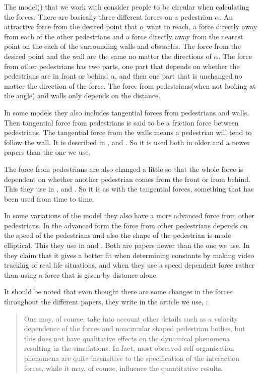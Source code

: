 The model(\cite{self-org}) that we work with consider people to be circular when calculating the forces. There are basically three different forces on a pedestrian $\alpha$. An attractive force from the desired point that $\alpha$ want to reach, a force directly away from each of the other pedestrians and a force directly away from the nearest point on the each of the surrounding  walls and obstacles. The force from the desired point and the wall are the same no matter the directions of $\alpha$. The force from other pedestrians has two parts, one part that depends on whether the pedestrians are in front or behind $\alpha$, and then one part that is unchanged no matter the direction of the force. The force from pedestrians(when not looking at the angle) and walls only depends on the distance. 

In some models they also includes tangential forces from pedestrians and walls. Then tangential force from pedestrians is said to be a friction force between pedestrians. The tangential force from the walls means a pedestrian will tend to follow the wall. It is described in \cite{helbing00},  and \cite{HelbingNew}. So it is used both in older and a newer papers than the one we use.

The force from pedestrians are also changed a little so that the whole force is dependent on whether another pedestrian comes from the front or from behind. This they use in \cite{ABconstant}, \cite{HelbingNew} and  \cite{helbing00}. So it is as with the tangential forces, something that has been used from time to time. 

In some variations of the model they also have a more advanced force from other pedestrians. In the advanced form the force from other pedestrians depends on the speed of the pedestrians and also the shape of the pedestrian is made elliptical. This they use in \cite{HelbingNew} and \cite{ABconstant}.  Both are papers newer than the one we use. In \cite{ABconstant} they claim that it gives a better fit when determining constants by making video tracking of real life situations, and when they use a speed dependent force rather than using a force that is given by distance alone. 



It should be noted that even thought there are some changes in the forces throughout the different papers, they write in the article we use, \cite{self-org}:
\begin{quote}
 One may, of
course, take into account other details such as a velocity
dependence of the forces and noncircular shaped
pedestrian bodies, but this does not have qualitative
effects on the dynamical phenomena resulting in the
simulations. In fact, most observed self-organization
phenomena are quite insensitive to the specification
of the interaction forces, while it may, of course, influence
the quantitative results.
\end{quote}

